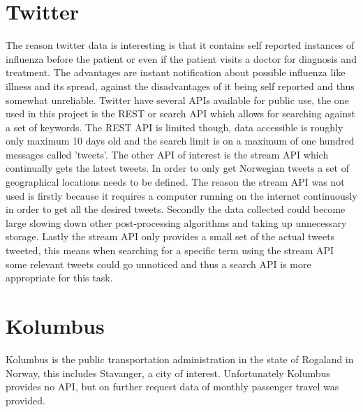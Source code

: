 \section{Twitter}
The reason twitter data is interesting is that it contains self reported instances of influenza before the patient or even if the patient visits a doctor for diagnosis and treatment. The advantages are instant notification about possible influenza like illness and its spread, against the disadvantages of it being self reported and thus somewhat unreliable. Twitter have several APIs available for public use, the one used in this project is the REST or search API which allows for searching against a set of keywords. The REST API is limited though, data accessible is roughly only maximum 10 days old and the search limit is on a maximum of one hundred messages called 'tweets'. The other API of interest is the stream API which continually gets the latest tweets. In order to only get Norwegian tweets a set of geographical locations needs to be defined. The reason the stream API was not used is firstly because it requires a computer running on the internet continuously in order to get all the desired tweets. Secondly the data collected could become large slowing down other post-processing algorithms and taking up unnecessary storage. Lastly the stream API only provides a small set of the actual tweets tweeted, this means when searching for a specific term using the stream API some relevant tweets could go unnoticed and thus a search API is more appropriate for this task.

\section{Kolumbus}
Kolumbus is the public transportation administration in the state of Rogaland in Norway, this includes Stavanger, a city of interest. Unfortunately Kolumbus provides no API, but on further request data of monthly passenger travel was provided.